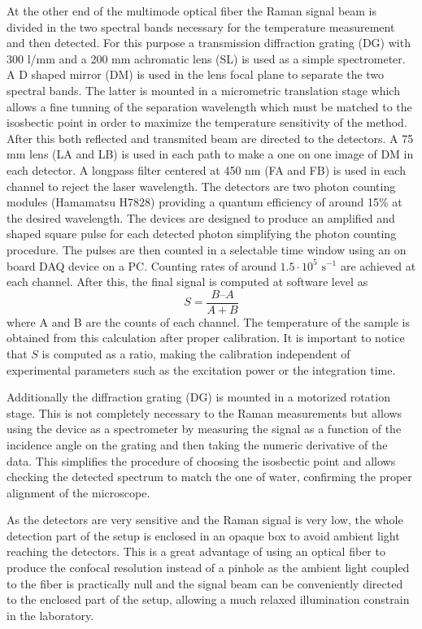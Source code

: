 \documentclass[twocolumn]{svjour3}       %
\begin{document}
At the other end of the multimode optical fiber the Raman signal beam is divided in the two spectral bands necessary for the temperature measurement and then detected. For this purpose a transmission diffraction grating (DG) with 300 l/mm and a 200 mm achromatic lens (SL) is used as a simple spectrometer. A D shaped mirror (DM) is used in the lens focal plane to separate the two spectral bands. The latter is mounted in a micrometric translation stage which allows a fine tunning of the separation wavelength which must be matched to the isosbectic point in order to maximize the temperature sensitivity of the method. After this both reflected and transmited beam are directed to the detectors. A 75 mm lens (LA and LB) is used in each path to make a one on one image of DM in each detector. A longpass filter centered at 450 nm (FA and FB) is used in each channel to reject the laser wavelength. The detectors are two photon counting modules (Hamamatsu H7828) providing a quantum efficiency of around 15\% at the desired wavelength. The devices are designed to produce an amplified and shaped square pulse for each detected photon simplifying the photon counting procedure. The pulses are then counted in a selectable time window using an on board DAQ device on a PC. Counting rates of around $1.5 \cdot 10^5 \,\,\mathrm{s}^{-1}$ are achieved at each channel. After this, the final signal is computed at software level as
\begin{equation}\label{eq:S}
S = \frac{B – A}{A + B}
\end{equation}
where A and B are the counts of each channel. The temperature of the sample is obtained from this calculation after proper calibration.  It is important to notice that $S$ is computed as a ratio, making the calibration independent of experimental parameters such as the excitation power or the integration time.

Additionally the diffraction grating (DG) is mounted in a motorized rotation stage.  This is not completely necessary to the Raman measurements but allows using the device as a spectrometer by measuring the signal as a function of the incidence angle on the grating and then taking the numeric derivative of the data. This simplifies the procedure of choosing the isosbectic point and allows checking the detected spectrum to match the one of water, confirming the proper alignment of the microscope. 

As the detectors are very sensitive and the Raman signal is very low, the whole detection part of the setup is enclosed in an opaque box to avoid ambient light reaching the detectors. This is a great advantage of using an optical fiber to produce the confocal resolution instead of a pinhole as the ambient light coupled to the fiber is practically null and the signal beam can be conveniently directed to the enclosed part of the setup, allowing a much relaxed illumination constrain in the laboratory. 
\end{document}
